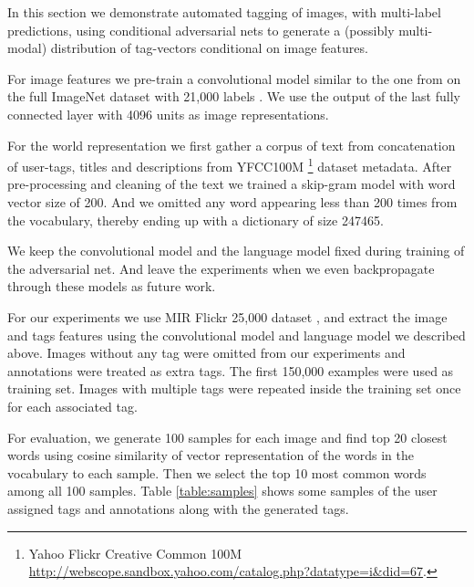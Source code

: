 \documentclass{article} %
\begin{document}
In this section we demonstrate automated tagging of images, with multi-label predictions,
using conditional adversarial nets to generate a (possibly multi-modal) distribution
of tag-vectors conditional on image features.


For image features we pre-train a convolutional model similar to the one from \cite{Krizhevsky-2012}
on the full ImageNet dataset with 21,000 labels \cite{RussakovskyFeiFei}.
We use the output of the last fully connected layer with 4096 units as image representations.

For the world representation we first gather a corpus of text from concatenation of user-tags, titles and descriptions from
YFCC100M \footnote{Yahoo Flickr Creative Common 100M \url{http://webscope.sandbox.yahoo.com/catalog.php?datatype=i&did=67}.}
dataset metadata. After pre-processing and cleaning of the text we trained a
skip-gram model \cite{mikolov-et-al-iclr2013} with word vector size of 200. And we omitted any word appearing
less than 200 times from the vocabulary,  thereby ending up with a dictionary of size 247465.

We keep the convolutional model and the language model fixed during training of the adversarial net.
And leave the experiments when we even backpropagate through these models as future work.

For our experiments we use MIR Flickr 25,000 dataset \cite{huiskes08}, and extract the image and
tags features using the convolutional model and language model we described above.
Images without any tag were omitted from our experiments and annotations were treated as extra tags.
The first 150,000 examples were used as training set.
Images with multiple tags were repeated inside the training set once for each associated tag.

For evaluation, we generate 100 samples for each image and find top 20 closest words
using cosine similarity of vector representation of the words in the vocabulary to each sample.
Then we select the top 10 most common words among all 100 samples.
Table \ref{table:samples} shows some samples of the user
assigned tags and annotations along with the generated tags.
\end{document}
